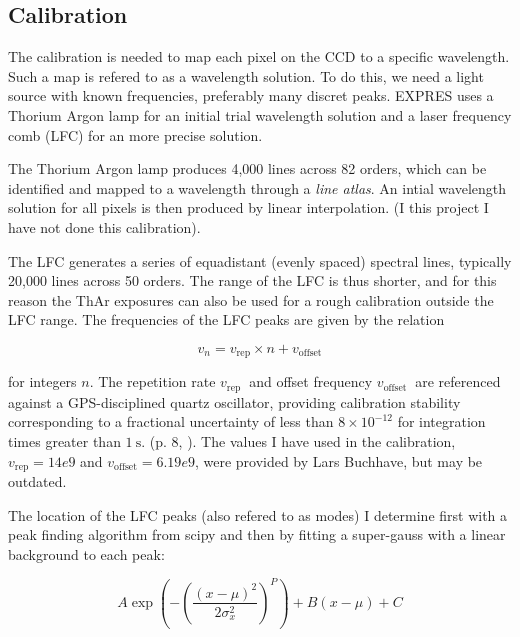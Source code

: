 \subsection{Calibration} 

    The calibration is needed to map each pixel on the CCD to a specific wavelength. Such a map is refered to as a wavelength solution. To do this, we need a light source with known frequencies, preferably many discret peaks. EXPRES uses a Thorium Argon lamp for an initial trial wavelength solution and a laser frequency comb (LFC) for an more precise solution.
    
    The Thorium Argon lamp produces 4,000 lines across 82 orders, which can be identified and mapped to a wavelength through a \emph{line atlas}. An intial wavelength solution for all pixels is then produced by linear interpolation. (I this project I have not done this calibration).

    The LFC generates a series of equadistant (evenly spaced) spectral lines, typically 20,000 lines across 50 orders. The range of the LFC is thus shorter, and for this reason the ThAr exposures can also be used for a rough calibration outside the LFC range. The frequencies of the LFC peaks are given by the relation
    
    \begin{equation}
        \label{eq:LFC_freq_eq}
        v_{n}=v_{\text{rep}} \times n+v_{\text{offset}}
    \end{equation}

    for integers $n$. The repetition rate $v_{\text {rep }}$ and offset frequency $v_{\text {offset }}$ are referenced against a GPS-disciplined quartz oscillator, providing calibration stability corresponding to a fractional uncertainty of less than $8 \times 10^{-12}$ for integration times greater than $1 \mathrm{~s}$. (p. 8, \cite{first_RV_from_EXPRES}). The values I have used in the calibration, $v_{\text{rep}} = 14e9$ and $v_{\text{offset}} = 6.19e9$, were provided by Lars Buchhave, but may be outdated. 

    The location of the LFC peaks (also refered to as modes) I determine first with a peak finding algorithm from scipy and then by fitting a super-gauss with a linear background to each peak:
    
    \begin{equation}
        \label{eq:LFC_super_gauss}
        A \exp \left(-\left(\frac{\left(x-\mu\right)^{2}}{2 \sigma_{x}^{2}}\right)^{P}\right) + B(x-\mu) + C
    \end{equation}
    
